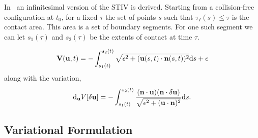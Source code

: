 \documentclass[preprint, 10pt]{elsarticle}
\begin{document}
In~\cite{Lu2017} an infinitesimal version of the STIV is derived.
Starting from a collision-free configuration at $t_0$, for a fixed
$\tau$ the set of points $s$ such that $\tau_I(s)\leq \tau$ is the
contact area. This area is a set of boundary segments. For one such
segment we can let $s_1(\tau)$ and $s_2(\tau)$ be the extents of contact
at time $\tau$. 

\begin{align*}
  \mathbf{V}({\mathbf{u}},t) = -\int_{s_1(t)}^{s_2(t)} 
    \sqrt{\epsilon^2 + ({\mathbf{u}}(s,t)\cdot{\mathbf{n}}(s,t))^2}\text{d}s + \epsilon
\end{align*}
along with the variation, 
\begin{align*}
  \text{d}_{{\mathbf{u}}}V[\delta\mathbf{u}] = 
  -\int_{s_1(t)}^{s_2(t)} \frac{({\mathbf{n}}\cdot{\mathbf{u}})({\mathbf{n}}\cdot\delta{\mathbf{u}})}
  {\sqrt{\epsilon^2 + ({\mathbf{u}}\cdot{\mathbf{n}})^2}}\text{d}s.
\end{align*}




\subsection{Variational Formulation}
\end{document}
